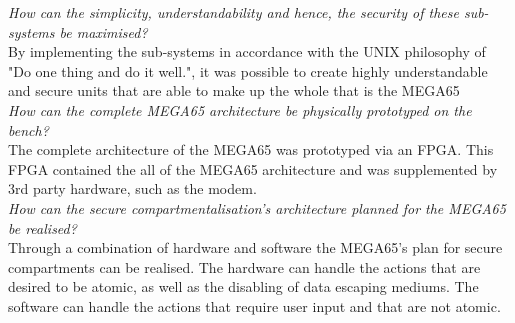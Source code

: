 \textit{How can the simplicity, understandability and hence, the security of these sub-systems be maximised?}\\
By implementing the sub-systems in accordance with the UNIX philosophy of "Do one thing and do it well.", it was possible to create highly understandable and secure units that are able to make up the whole that is the MEGA65
\\
\textit{How can the complete MEGA65 architecture be physically prototyped on the bench?}\\
The complete architecture of the MEGA65 was prototyped via an FPGA. This FPGA contained the all of the MEGA65 architecture and was supplemented by 3rd party hardware, such as the modem.
\\
\textit{How can the secure compartmentalisation's architecture planned for the MEGA65 be realised?}\\
Through a combination of hardware and software the MEGA65's plan for secure compartments can be realised. The hardware can handle the actions that are desired to be atomic, as well as the disabling of data escaping mediums. The software can handle the actions that require user input and that are not atomic.
